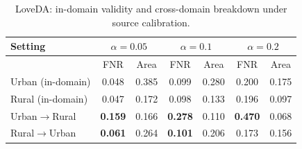 \begin{table}[t]
\centering
\caption{LoveDA: in-domain validity and cross-domain breakdown under source calibration.}
\label{tab:loveda}
\footnotesize
\setlength{\tabcolsep}{3pt}
\begin{tabular}{lcccccc}
\toprule
Setting & \multicolumn{2}{c}{$\alpha=0.05$} & \multicolumn{2}{c}{$\alpha=0.1$} & \multicolumn{2}{c}{$\alpha=0.2$} \\
\midrule
 & FNR & Area & FNR & Area & FNR & Area \\
\midrule
Urban (in-domain) & 0.048 & 0.385 & 0.099 & 0.280 & 0.200 & 0.175 \\
Rural (in-domain) & 0.047 & 0.172 & 0.098 & 0.133 & 0.196 & 0.097 \\
\addlinespace
Urban$\to$Rural & \textbf{0.159} & 0.166 & \textbf{0.278} & 0.110 & \textbf{0.470} & 0.068 \\
Rural$\to$Urban & \textbf{0.061} & 0.264 & \textbf{0.101} & 0.206 & 0.173 & 0.156 \\
\bottomrule
\end{tabular}
\end{table}
